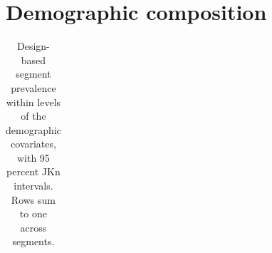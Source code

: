 \documentclass[
  12pt]{article}
\begin{document}
\section{Demographic composition}\label{sec-results-demographics}

\begin{longtable}[]{@{}
  >{\raggedright\arraybackslash}p{}
  >{\raggedright\arraybackslash}p{}
  >{\raggedright\arraybackslash}p{}
  >{\raggedright\arraybackslash}p{}
  >{\raggedright\arraybackslash}p{}
  >{\raggedright\arraybackslash}p{}
  >{\raggedright\arraybackslash}p{}@{}}

\caption{\label{tbl-demo}Design-based segment prevalence within levels
of the demographic covariates, with 95 percent JKn intervals. Rows sum
to one across segments.}

\tabularnewline


\end{longtable}
\end{document}
